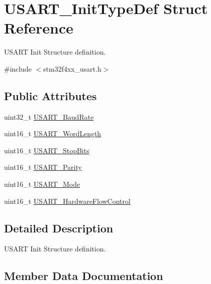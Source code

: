 \hypertarget{struct_u_s_a_r_t___init_type_def}{}\section{U\+S\+A\+R\+T\+\_\+\+Init\+Type\+Def Struct Reference}
\label{struct_u_s_a_r_t___init_type_def}


U\+S\+A\+RT Init Structure definition.  




{\ttfamily \#include $<$stm32f4xx\+\_\+usart.\+h$>$}

\subsection*{Public Attributes}
\begin{DoxyCompactItemize}
\item 
uint32\+\_\+t \hyperlink{struct_u_s_a_r_t___init_type_def_a6f763cb0e6044f838ee764ce437997b2}{U\+S\+A\+R\+T\+\_\+\+Baud\+Rate}
\item 
uint16\+\_\+t \hyperlink{struct_u_s_a_r_t___init_type_def_a16d1fb7ccc2b51964f1bcfcbfba6d89d}{U\+S\+A\+R\+T\+\_\+\+Word\+Length}
\item 
uint16\+\_\+t \hyperlink{struct_u_s_a_r_t___init_type_def_ac745bceb79a6c4c2640fd8e8ce6639d6}{U\+S\+A\+R\+T\+\_\+\+Stop\+Bits}
\item 
uint16\+\_\+t \hyperlink{struct_u_s_a_r_t___init_type_def_a5ae66aba755bac37c5cf0dfbf529e2ed}{U\+S\+A\+R\+T\+\_\+\+Parity}
\item 
uint16\+\_\+t \hyperlink{struct_u_s_a_r_t___init_type_def_a7d944d35d7d1fc79a63f249615148584}{U\+S\+A\+R\+T\+\_\+\+Mode}
\item 
uint16\+\_\+t \hyperlink{struct_u_s_a_r_t___init_type_def_a9996edf3bfd90c36f03b4075969703f5}{U\+S\+A\+R\+T\+\_\+\+Hardware\+Flow\+Control}
\end{DoxyCompactItemize}


\subsection{Detailed Description}
U\+S\+A\+RT Init Structure definition. 

\subsection{Member Data Documentation}
